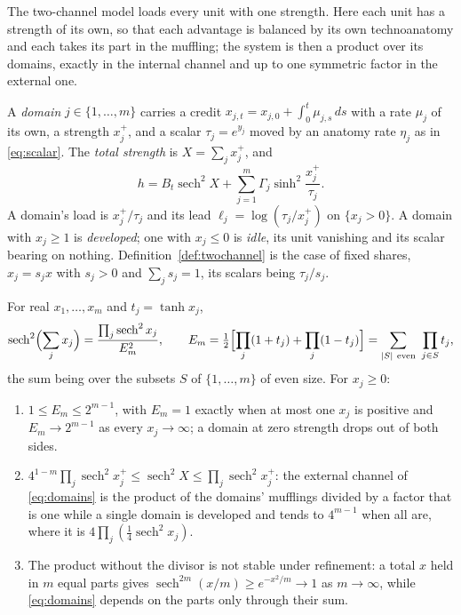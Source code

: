 The two-channel model loads every unit with one strength. Here each unit
has a strength of its own, so that each advantage is balanced by its own
technoanatomy and each takes its part in the muffling; the system is then
a product over its domains, exactly in the internal channel and up to one
symmetric factor in the external one.

\begin{definition}\label{def:domains}
A \emph{domain} $j\in\{1,\dots,m\}$ carries a credit
$x_{j,t}=x_{j,0}+\int_0^t\mu_{j,s}\,ds$ with a rate $\mu_j$ of its own, a
strength $x_j^+$, and a scalar $\tau_j=e^{y_j}$ moved by an anatomy rate
$\eta_j$ as in \eqref{eq:scalar}. The \emph{total strength} is
$X=\sum_jx_j^+$, and
\begin{equation}\label{eq:domains}
h=B_t\operatorname{sech}^2X+\sum_{j=1}^m\Gamma_j\sinh^2\frac{x_j^+}{\tau_j}.
\end{equation}
A domain's load is $x_j^+/\tau_j$ and its lead
$\ell_j=\log(\tau_j/x_j^+)$ on $\{x_j>0\}$. A domain with $x_j\ge1$ is
\emph{developed}; one with $x_j\le0$ is \emph{idle}, its unit vanishing
and its scalar bearing on nothing. Definition~\ref{def:twochannel} is the
case of fixed shares, $x_j=s_jx$ with $s_j>0$ and $\sum_js_j=1$, its
scalars being $\tau_j/s_j$.
\end{definition}

\begin{proposition}\label{prop:addition}
For real $x_1,\dots,x_m$ and $t_j=\tanh x_j$,
\begin{equation}\label{eq:addition}
\operatorname{sech}^2\Bigl(\sum_jx_j\Bigr)=\frac{\prod_j\operatorname{sech}^2x_j}{E_m^2},
\qquad
E_m=\tfrac12\Bigl[\prod_j(1+t_j)+\prod_j(1-t_j)\Bigr]
=\sum_{|S|\ \mathrm{even}}\ \prod_{j\in S}t_j,
\end{equation}
the sum being over the subsets $S$ of $\{1,\dots,m\}$ of even size. For
$x_j\ge0$:
\begin{enumerate}[label=\emph{(\roman*)},itemsep=1pt]
\item $1\le E_m\le2^{m-1}$, with $E_m=1$ exactly when at most one $x_j$ is
positive and $E_m\to2^{m-1}$ as every $x_j\to\infty$; a domain at zero
strength drops out of both sides.
\item $4^{1-m}\prod_j\operatorname{sech}^2x_j^+\le\operatorname{sech}^2X\le\prod_j\operatorname{sech}^2x_j^+$:
the external channel of \eqref{eq:domains} is the product of the domains'
mufflings divided by a factor that is one while a single domain is
developed and tends to $4^{m-1}$ when all are, where it is
$4\prod_j(\tfrac14\operatorname{sech}^2x_j)$.
\item The product without the divisor is not stable under refinement: a
total $x$ held in $m$ equal parts gives
$\operatorname{sech}^{2m}(x/m)\ge e^{-x^2/m}\to1$ as $m\to\infty$, while
\eqref{eq:domains} depends on the parts only through their sum.
\end{enumerate}
\end{proposition}


